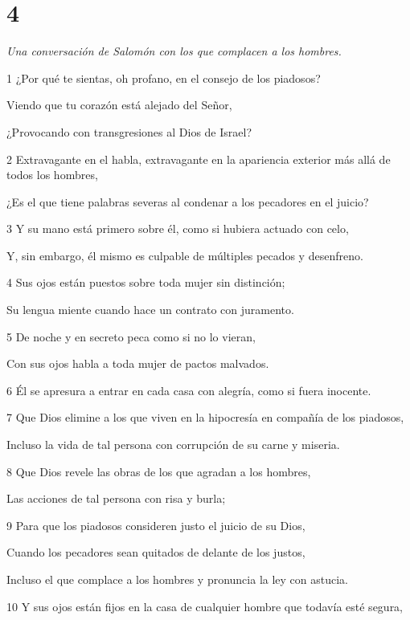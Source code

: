 \chapter{4}

\par \textit{Una conversación de Salomón con los que complacen a los hombres.}

\par 1 ¿Por qué te sientas, oh profano, en el consejo de los piadosos?
\par     Viendo que tu corazón está alejado del Señor,
\par     ¿Provocando con transgresiones al Dios de Israel?
\par 2 Extravagante en el habla, extravagante en la apariencia exterior más allá de todos los hombres,
\par     ¿Es el que tiene palabras severas al condenar a los pecadores en el juicio?
\par 3 Y su mano está primero sobre él, como si hubiera actuado con celo,
\par     Y, sin embargo, él mismo es culpable de múltiples pecados y desenfreno.
\par 4 Sus ojos están puestos sobre toda mujer sin distinción;
\par     Su lengua miente cuando hace un contrato con juramento.
\par 5 De noche y en secreto peca como si no lo vieran,
\par     Con sus ojos habla a toda mujer de pactos malvados.
\par 6 Él se apresura a entrar en cada casa con alegría, como si fuera inocente.
\par   
\par 7 Que Dios elimine a los que viven en la hipocresía en compañía de los piadosos,
\par     Incluso la vida de tal persona con corrupción de su carne y miseria.
\par 8 Que Dios revele las obras de los que agradan a los hombres,
\par     Las acciones de tal persona con risa y burla;
\par 9 Para que los piadosos consideren justo el juicio de su Dios,
\par     Cuando los pecadores sean quitados de delante de los justos,
\par     Incluso el que complace a los hombres y pronuncia la ley con astucia.
\par 10 Y sus ojos están fijos en la casa de cualquier hombre que todavía esté segura,
